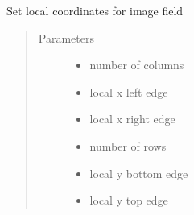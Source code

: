 \documentclass[letterpaper,10pt,english]{sphinxmanual}
\begin{document}
\begin{fulllineitems}
\label{\detokenize{images_functions:images.setfield}}
Set local coordinates for image field
\begin{quote}\begin{description}
\item[{Parameters}] \leavevmode\begin{itemize}
\item {} 
 \textendash{} number of columns

\item {} 
 \textendash{} local x left edge

\item {} 
 \textendash{} local x right edge

\item {} 
 \textendash{} number of rows

\item {} 
 \textendash{} local y bottom edge

\item {} 
 \textendash{} local y top edge

\end{itemize}

\end{description}\end{quote}

\end{fulllineitems}

\end{document}
